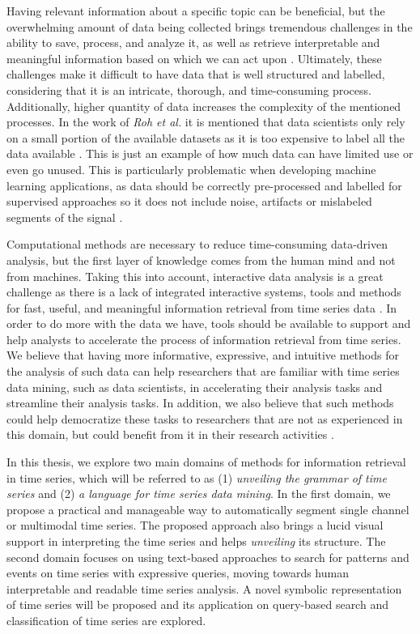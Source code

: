 Having relevant information about a specific topic can be beneficial, but the overwhelming amount of data being collected brings tremendous challenges in the ability to save, process, and analyze it, as well as retrieve interpretable and meaningful information based on which we can act upon \cite{bigdata}. Ultimately, these challenges make it difficult to have data that is well structured and labelled, considering that it is an intricate, thorough, and time-consuming process. Additionally, higher quantity of data increases the complexity of the mentioned processes. In the work of \textit{Roh et al.} it is mentioned that data scientists only rely on a small portion of the available datasets as it is too expensive to label all the data available \cite{roh2019survey}. This is just an example of how much data can have limited use or even go unused. This is particularly problematic when developing machine learning applications, as data should be correctly pre-processed and labelled for supervised approaches so it does not include noise, artifacts or mislabeled segments of the signal \cite{roh2019survey}. 

Computational methods are necessary to reduce time-consuming data-driven analysis, but the first layer of knowledge comes from the human mind and not from machines. Taking this into account, interactive data analysis is a great challenge as there is a lack of integrated interactive systems, tools and methods for fast, useful, and meaningful information retrieval from time series data \cite{intuition1, intuition2, holzinger, machado2015}. In order to do more with the data we have, tools should be available to support and help analysts to accelerate the process of information retrieval from time series. We believe that having more informative, expressive, and intuitive methods for the analysis of such data can help researchers that are familiar with time series data mining, such as data scientists, in accelerating their analysis tasks and streamline their analysis tasks. In addition, we also believe that such methods could help democratize these tasks to researchers that are not as experienced in this domain, but could benefit from it in their research activities \cite{democratize}.

In this thesis, we explore two main domains of methods for information retrieval in time series, which will be referred to as (1) \textit{unveiling the grammar of time series} and (2) \textit{a language for time series data mining}. In the first domain, we propose a practical and manageable way to automatically segment single channel or multimodal time series. The proposed approach also brings a lucid visual support in interpreting the time series and helps \textit{unveiling} its structure. The second domain focuses on using text-based approaches to search for patterns and events on time series with expressive queries, moving towards human interpretable and readable time series analysis. A novel symbolic representation of time series will be proposed and its application on query-based search and classification of time series are explored.

